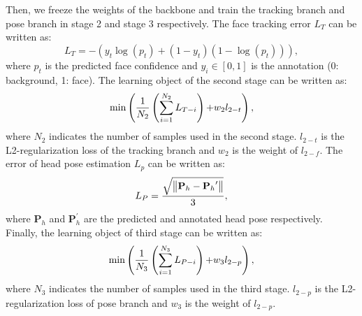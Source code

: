 \documentclass[3p,twocolumn, round, sort & compress]{elsarticle}
\begin{document}
Then, we freeze the weights of the backbone and train the tracking branch and pose branch in stage 2 and stage 3 respectively. The face tracking error $L_T$ can be written as:
\begin{equation}
{L_T} =  - \left( {{y_t}\log \left( {{p_t}} \right) + \left( {1 - {y_t}} \right)\left( {1 - \log \left( {{p_t}} \right)} \right)} \right),
\end{equation}
where $p_t$ is the predicted face confidence and $y_i\in[0,1]$ is the annotation (0: background, 1: face). The learning object of the second stage can be written as:
\begin{equation}
\min \left( {\frac{1}{{{N_2}}}\left( {\sum\limits_{i = 1}^{{N_2}} {{L_{T-i}}} } \right){\rm{ + }}{w_2}{l_{2 - t}}} \right),
\end{equation}
where $N_2$ indicates the number of samples used in the second stage. $l_{2-t}$ is the L2-regularization loss of the tracking branch and $w_2$ is the weight of $l_{2-f}$. The error of head pose estimation $L_p$ can be written as:
\begin{equation}
{L_P} = \frac{{\sqrt {\left\| {{{\bf{P}}_h} - {{\bf{P}}_h}^\prime } \right\|} }}{3},
\end{equation}
where $\bm{P}_h$ and $\bm{P}_h^\prime$ are the predicted and annotated head pose respectively. Finally, the learning object of third stage can be written as:
\begin{equation}
\min \left( {\frac{1}{{{N_3}}}\left( {\sum\limits_{i = 1}^{{N_3}} {{L_{P-i}}} } \right){\rm{ + }}{w_3}{l_{2 - p}}} \right),
\end{equation}
where $N_3$ indicates the number of samples used in the third stage. $l_{2-p}$ is the L2-regularization loss of pose branch and $w_3$ is the weight of $l_{2-p}$.
\end{document}
